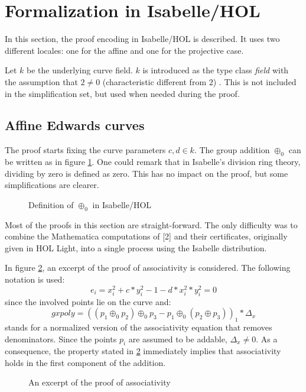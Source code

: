 \documentclass[runningheads]{llncs}
\begin{document}
\section{Formalization in Isabelle/HOL}

In this section, the proof encoding in Isabelle/HOL is described. It uses two different locales: one for the affine and one for the projective case.

Let $k$ be the underlying curve field. $k$ is introduced as the type class \textit{field} with the assumption that $2 \neq 0$ (characteristic different from $2$) \cite{Elliptic_Curves_Group_Law-AFP}. This is not included in the simplification set, but used when needed during the proof.   

\subsection{Affine Edwards curves}

The proof starts fixing the curve parameters $c,d \in k$. The group addition $\oplus_0$ can be written as in figure \ref{fig:1}. One could remark that in Isabelle's division ring theory, dividing by zero is defined as zero. This has no impact on the proof, but some simplifications are clearer.

\begin{figure}
	{}
	\caption{Definition of $\oplus_0$ in Isabelle/HOL}
	\label{fig:1}
\end{figure}

Most of the proofs in this section are straight-forward. The only difficulty was to combine the Mathematica computations of [2] and their certificates, originally given in HOL Light, into a single process using the Isabelle distribution.

In figure \ref{fig:2}, an excerpt of the proof of associativity is considered. The following notation is used: $$e_i = x_i^2 + c * y_i^2 - 1 - d * x_i^2 * y_i^2 = 0$$ since the involved points lie on the curve and: $$gxpoly = ((p_1 \oplus_0 p_2) \oplus_0 p_3 - p_1 \oplus_0 (p_2 \oplus p_3))_1*\Delta_x$$ stands for a normalized version of the associativity equation that removes denominators. Since the points $p_i$ are assumed to be addable, $\Delta_x \neq 0$. As a consequence, the property stated in \ref{fig:2} immediately implies that associativity holds in the first component of the addition.


\begin{figure}
	{}
	\caption{An excerpt of the proof of associativity}
	\label{fig:2}
\end{figure}
\end{document}
